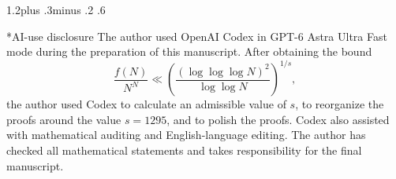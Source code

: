 \documentclass[twoside]{aomart}
\makeatletter
\theoremstyle{paperplain}
\theoremstyle{paperdefinition}
\renewcommand\section{\@startsection{section}{1}{\z@}
  {1.2\baselineskip plus .3\baselineskip minus .2\baselineskip}
  {.6\baselineskip}{\normalfont\large\bfseries\raggedright}}
\numberwithin{equation}{section}
\makeatother
\begin{document}
\section*{AI-use disclosure}
The author used OpenAI Codex in GPT-6 Astra Ultra Fast mode during
the preparation of this manuscript. After obtaining
the bound
\begin{equation*}
 \frac{f(N)}{N^N}
 \ll\left(\frac{(\log\log\log N)^2}{\log\log N}\right)^{1/s},
\end{equation*}
the author used Codex to
calculate an admissible value of $s$, to reorganize the proofs
around the value $s=1295$, and to polish the proofs. Codex also assisted with mathematical
auditing and English-language editing. The author has checked all
mathematical statements and takes responsibility for the final manuscript.
\providecommand{\bysame}{\leavevmode\hbox to3em{\hrulefill}\thinspace}
\providecommand{\noopsort}[1]{}
\providecommand{\mr}[1]{\href{http://www.ams.org/mathscinet-getitem?mr=#1}{MR~#1}}
\providecommand{\zbl}[1]{\href{http://www.zentralblatt-math.org/zmath/en/search/?q=an:#1}{Zbl~#1}}
\providecommand{\jfm}[1]{\href{http://www.emis.de/cgi-bin/JFM-item?#1}{JFM~#1}}
\providecommand{\arxiv}[1]{\href{http://www.arxiv.org/abs/#1}{arXiv~#1}}
\providecommand{\doi}[1]{\url{https://doi.org/#1}}
\providecommand{\MR}{\relax\ifhmode\unskip\space\fi MR }
\providecommand{\MRhref}[2]{%
  \href{http://www.ams.org/mathscinet-getitem?mr=#1}{#2}
}
\providecommand{\href}[2]{#2}
\end{document}
